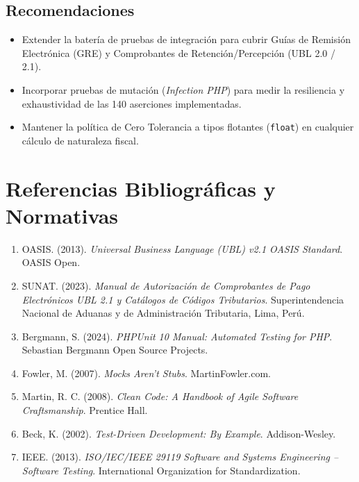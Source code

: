 \documentclass[11pt,a4paper]{article}
\begin{document}
\subsection{Recomendaciones}
\begin{itemize}[noitemsep]
    \item Extender la batería de pruebas de integración para cubrir Guías de Remisión Electrónica (GRE) y Comprobantes de Retención/Percepción (UBL 2.0 / 2.1).
    \item Incorporar pruebas de mutación (\textit{Infection PHP}) para medir la resiliencia y exhaustividad de las 140 aserciones implementadas.
    \item Mantener la política de Cero Tolerancia a tipos flotantes (\texttt{float}) en cualquier cálculo de naturaleza fiscal.
\end{itemize}

\section*{Referencias Bibliográficas y Normativas}

\begin{enumerate}[noitemsep]
    \item OASIS. (2013). \textit{Universal Business Language (UBL) v2.1 OASIS Standard}. OASIS Open.
    \item SUNAT. (2023). \textit{Manual de Autorización de Comprobantes de Pago Electrónicos UBL 2.1 y Catálogos de Códigos Tributarios}. Superintendencia Nacional de Aduanas y de Administración Tributaria, Lima, Perú.
    \item Bergmann, S. (2024). \textit{PHPUnit 10 Manual: Automated Testing for PHP}. Sebastian Bergmann Open Source Projects.
    \item Fowler, M. (2007). \textit{Mocks Aren't Stubs}. MartinFowler.com.
    \item Martin, R. C. (2008). \textit{Clean Code: A Handbook of Agile Software Craftsmanship}. Prentice Hall.
    \item Beck, K. (2002). \textit{Test-Driven Development: By Example}. Addison-Wesley.
    \item IEEE. (2013). \textit{ISO/IEC/IEEE 29119 Software and Systems Engineering -- Software Testing}. International Organization for Standardization.
\end{enumerate}
\end{document}
